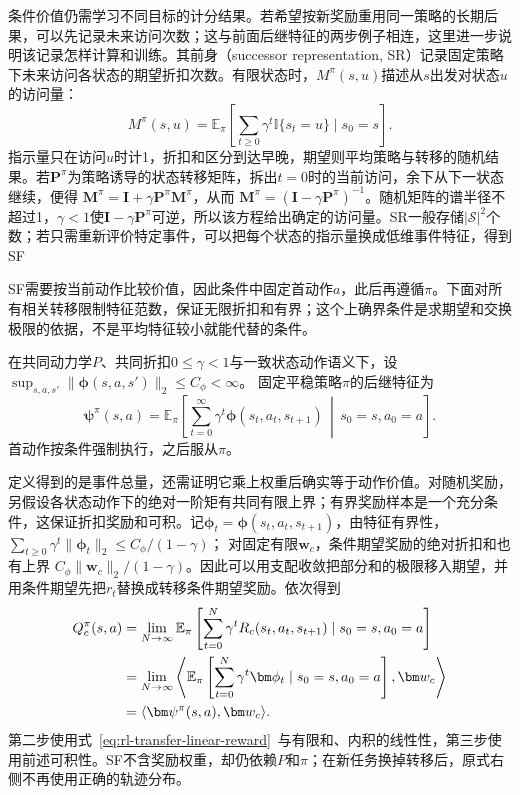 条件价值仍需学习不同目标的计分结果。若希望按新奖励重用同一策略的长期后果，可以先记录未来访问次数；这与前面后继特征的两步例子相连，这里进一步说明该记录怎样计算和训练。其前身（successor representation, SR）记录固定策略下未来访问各状态的期望折扣次数。有限状态时，$M^\pi(s,u)$描述从$s$出发对状态$u$的访问量：
\[
 M^\pi(s,u)=\mathbb E_\pi\!\left[\sum_{t\geq0}\gamma^t
       \mathbb I\{s_t=u\}\mid s_0=s\right].
\]
指示量只在访问$u$时计1，折扣和区分到达早晚，期望则平均策略与转移的随机结果。若$\bm P^\pi$为策略诱导的状态转移矩阵，拆出$t=0$时的当前访问，余下从下一状态继续，便得
$\bm M^\pi=\bm I+\gamma\bm P^\pi\bm M^\pi$，从而
$\bm M^\pi=(\bm I-\gamma\bm P^\pi)^{-1}$。随机矩阵的谱半径不超过1，$\gamma<1$使$\bm I-\gamma\bm P^\pi$可逆，所以该方程给出确定的访问量。SR一般存储$|\mathcal S|^2$个数；若只需重新评价特定事件，可以把每个状态的指示量换成低维事件特征，得到SF

SF需要按当前动作比较价值，因此条件中固定首动作$a$，此后再遵循$\pi$。下面对所有相关转移限制特征范数，保证无限折扣和有界；这个上确界条件是求期望和交换极限的依据，不是平均特征较小就能代替的条件。

\begin{definition}[固定策略的后继特征]
 \label{def:rl-transfer-sf}
 在共同动力学$P$、共同折扣$0\leq\gamma<1$与一致状态动作语义下，设
 $\sup_{s,a,s'}\lVert\bm\phi(s,a,s')\rVert_2\leq C_\phi<\infty$。
 固定平稳策略$\pi$的后继特征为
 \begin{equation}
 \bm\psi^\pi(s,a)=
 \mathbb E_\pi\!\left[
 \sum_{t=0}^{\infty}\gamma^t\bm\phi(s_t,a_t,s_{t+1})
 \,\middle|\,s_0=s,a_0=a\right].
 \label{eq:rl-transfer-sf}
 \end{equation}
 首动作按条件强制执行，之后服从$\pi$。
\end{definition}

定义得到的是事件总量，还需证明它乘上权重后确实等于动作价值。对随机奖励，另假设各状态动作下的绝对一阶矩有共同有限上界；有界奖励样本是一个充分条件，这保证折扣奖励和可积。记$\bm\phi_t=\bm\phi(s_t,a_t,s_{t+1})$，由特征有界性，
$\sum_{t\geq0}\gamma^t\lVert\bm\phi_t\rVert_2\leq C_\phi/(1-\gamma)$；
对固定有限$\bm w_c$，条件期望奖励的绝对折扣和也有上界
$C_\phi\lVert\bm w_c\rVert_2/(1-\gamma)$。因此可以用支配收敛把部分和的极限移入期望，并用条件期望先把$r_t$替换成转移条件期望奖励。依次得到
\begin{align}
 Q_c^\pi(s,a)
 &=\lim_{N\to\infty}\mathbb E_\pi
       \left[\sum_{t=0}^{N}\gamma^t R_c(s_t,a_t,s_{t+1})
       \mid s_0=s,a_0=a\right]\notag\\
 &=\lim_{N\to\infty}\left\langle
       \mathbb E_\pi\left[\sum_{t=0}^{N}\gamma^t\bm\phi_t
       \mid s_0=s,a_0=a\right],\bm w_c\right\rangle\notag\\
 &=\langle\bm\psi^\pi(s,a),\bm w_c\rangle.
 \label{eq:rl-transfer-sf-value}
\end{align}
第二步使用式~\eqref{eq:rl-transfer-linear-reward}~与有限和、内积的线性性，第三步使用前述可积性。SF不含奖励权重，却仍依赖$P$和$\pi$；在新任务换掉转移后，原式右侧不再使用正确的轨迹分布。

